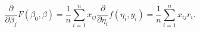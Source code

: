 \[
  \frac{\partial}{\partial \beta_j} F( \beta_0, \beta ) = \frac{1}{n} \sum_{i=1}^n x_{ij} \frac{\partial}{\partial \eta_i} f( \eta_i, y_i) = \frac{1}{n} \sum_{i=1}^n x_{ij} r_i.
\]
